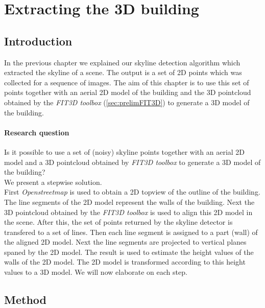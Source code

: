 


\section{Extracting the 3D building}
\label{sec:generate3dModel}
\subsection{Introduction}
In the previous chapter we explained our skyline detection algorithm which
extracted the skyline of a scene. The output is a set of 2D points which was  
collected for a sequence of images.
The aim of this chapter is to use this set of points together with an
 aerial 2D model of the building and the 3D pointcloud obtained by the \emph{FIT3D
 toolbox\cite{FIT3D}} (\ref{sec:prelimFIT3D}) to generate a 3D model of the
 building.


\paragraph{Research question}
Is it possible to use a set of (noisy) skyline points together with an aerial
2D model and a 3D pointcloud obtained by \emph{FIT3D toolbox\cite{FIT3D}} to
generate a 3D model of the building?\\

We present a stepwise solution.\\ 
First \emph{Openstreetmap\cite{Openstreetmap}} is used to obtain a 2D topview of
the outline of the building. The line segments of the 2D model represent the walls of the building. 
Next the 3D pointcloud obtained by the \emph{FIT3D toolbox\cite{FIT3D}} is used to align this 2D
model in the scene.  After this, the set of points returned by the skyline
detector is transfered to a set of lines. Then each line segment is assigned to
a part (wall) of the aligned 2D model.  Next the line segments are
projected to vertical planes spaned by the 2D model.  The result is used to
estimate the height values of the walls of the 2D model. The 2D model is
transformed according to this height values to a 3D
model. We will now elaborate on each step.\\


\subsection{Method}
